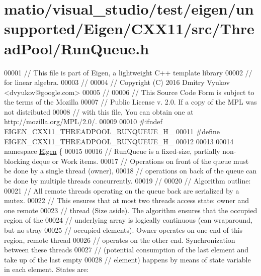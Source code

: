 \hypertarget{matio_2visual__studio_2test_2eigen_2unsupported_2_eigen_2_c_x_x11_2src_2_thread_pool_2_run_queue_8h_source}{}\section{matio/visual\+\_\+studio/test/eigen/unsupported/\+Eigen/\+C\+X\+X11/src/\+Thread\+Pool/\+Run\+Queue.h}
\label{matio_2visual__studio_2test_2eigen_2unsupported_2_eigen_2_c_x_x11_2src_2_thread_pool_2_run_queue_8h_source}

\begin{DoxyCode}
00001 \textcolor{comment}{// This file is part of Eigen, a lightweight C++ template library}
00002 \textcolor{comment}{// for linear algebra.}
00003 \textcolor{comment}{//}
00004 \textcolor{comment}{// Copyright (C) 2016 Dmitry Vyukov <dvyukov@google.com>}
00005 \textcolor{comment}{//}
00006 \textcolor{comment}{// This Source Code Form is subject to the terms of the Mozilla}
00007 \textcolor{comment}{// Public License v. 2.0. If a copy of the MPL was not distributed}
00008 \textcolor{comment}{// with this file, You can obtain one at http://mozilla.org/MPL/2.0/.}
00009 
00010 \textcolor{preprocessor}{#ifndef EIGEN\_CXX11\_THREADPOOL\_RUNQUEUE\_H\_}
00011 \textcolor{preprocessor}{#define EIGEN\_CXX11\_THREADPOOL\_RUNQUEUE\_H\_}
00012 
00013 
00014 \textcolor{keyword}{namespace }\hyperlink{namespace_eigen}{Eigen} \{
00015 
00016 \textcolor{comment}{// RunQueue is a fixed-size, partially non-blocking deque or Work items.}
00017 \textcolor{comment}{// Operations on front of the queue must be done by a single thread (owner),}
00018 \textcolor{comment}{// operations on back of the queue can be done by multiple threads concurrently.}
00019 \textcolor{comment}{//}
00020 \textcolor{comment}{// Algorithm outline:}
00021 \textcolor{comment}{// All remote threads operating on the queue back are serialized by a mutex.}
00022 \textcolor{comment}{// This ensures that at most two threads access state: owner and one remote}
00023 \textcolor{comment}{// thread (Size aside). The algorithm ensures that the occupied region of the}
00024 \textcolor{comment}{// underlying array is logically continuous (can wraparound, but no stray}
00025 \textcolor{comment}{// occupied elements). Owner operates on one end of this region, remote thread}
00026 \textcolor{comment}{// operates on the other end. Synchronization between these threads}
00027 \textcolor{comment}{// (potential consumption of the last element and take up of the last empty}
00028 \textcolor{comment}{// element) happens by means of state variable in each element. States are:}

\end{DoxyCode}
